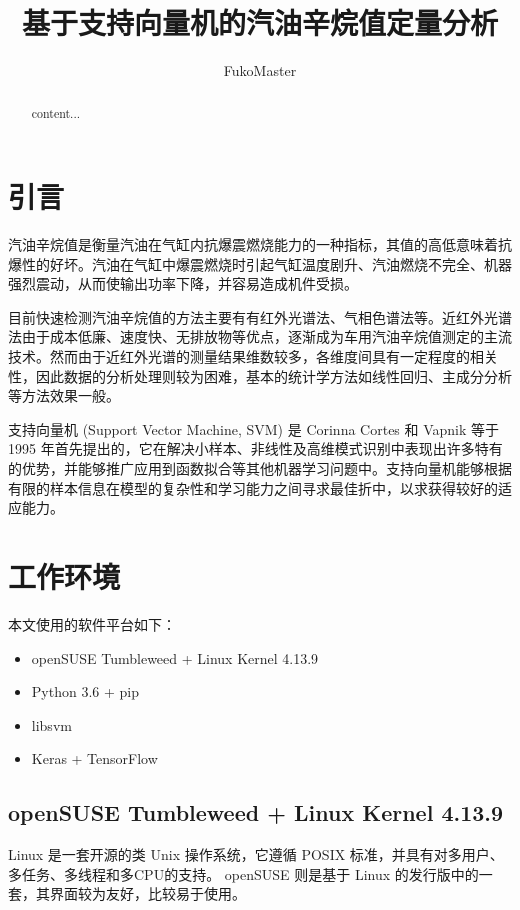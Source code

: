 \documentclass[a4paper]{article}
\title{基于支持向量机的汽油辛烷值定量分析}
\author{FukoMaster}
\begin{document}
	\maketitle
	
	\begin{abstract}
		content...
	\end{abstract}
	
	\tableofcontents
	
	\section{引言}
		汽油辛烷值是衡量汽油在气缸内抗爆震燃烧能力的一种指标，其值的高低意味着抗爆性的好坏。汽油在气缸中爆震燃烧时引起气缸温度剧升、汽油燃烧不完全、机器强烈震动，从而使输出功率下降，并容易造成机件受损。
		
		目前快速检测汽油辛烷值的方法主要有有红外光谱法、气相色谱法等。近红外光谱法由于成本低廉、速度快、无排放物等优点，逐渐成为车用汽油辛烷值测定的主流技术。然而由于近红外光谱的测量结果维数较多，各维度间具有一定程度的相关性，因此数据的分析处理则较为困难，基本的统计学方法如线性回归、主成分分析等方法效果一般。
		
		支持向量机 (Support Vector Machine, SVM) 是 Corinna Cortes 和 Vapnik 等于 1995 年首先提出的，它在解决小样本、非线性及高维模式识别中表现出许多特有的优势，并能够推广应用到函数拟合等其他机器学习问题中。支持向量机能够根据有限的样本信息在模型的复杂性和学习能力之间寻求最佳折中，以求获得较好的适应能力。
		
	\section{工作环境}
		本文使用的软件平台如下：
		
		\begin{itemize}
			\item openSUSE Tumbleweed + Linux Kernel 4.13.9
			\item Python 3.6 + pip
			\item libsvm
			\item Keras + TensorFlow
		\end{itemize}
	
		\subsection{openSUSE Tumbleweed + Linux Kernel 4.13.9}
			Linux 是一套开源的类 Unix 操作系统，它遵循 POSIX 标准，并具有对多用户、多任务、多线程和多CPU的支持。 
			openSUSE 则是基于 Linux 的发行版中的一套，其界面较为友好，比较易于使用。
\end{document}
